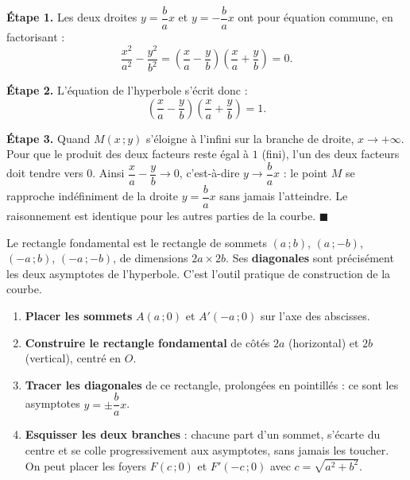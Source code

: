 \documentclass[11pt]{article}
\newcommand{\cle}[1]{{\popxbold\color{popdark}#1}}
\begin{document}
\begin{experience}
\textbf{Étape 1.} Les deux droites $y = \dfrac{b}{a}x$ et $y = -\dfrac{b}{a}x$ ont pour équation commune, en factorisant :
\[ \frac{x^2}{a^2} - \frac{y^2}{b^2} = \left(\frac{x}{a} - \frac{y}{b}\right)\left(\frac{x}{a} + \frac{y}{b}\right) = 0. \]

\textbf{Étape 2.} L'équation de l'hyperbole s'écrit donc :
\[ \left(\frac{x}{a} - \frac{y}{b}\right)\left(\frac{x}{a} + \frac{y}{b}\right) = 1. \]

\textbf{Étape 3.} Quand $M(x\,;y)$ s'éloigne à l'infini sur la branche de droite, $x \to +\infty$. Pour que le produit des deux facteurs reste égal à $1$ (fini), l'un des deux facteurs doit tendre vers $0$. Ainsi $\dfrac{x}{a} - \dfrac{y}{b} \to 0$, c'est-à-dire $y \to \dfrac{b}{a}x$ : le point $M$ se rapproche indéfiniment de la droite $y = \dfrac{b}{a}x$ sans jamais l'atteindre. Le raisonnement est identique pour les autres parties de la courbe. \hfill$\blacksquare$
\end{experience}

\begin{definition}
Le \cle{rectangle fondamental} est le rectangle de sommets $(a\,;b)$, $(a\,;-b)$, $(-a\,;b)$, $(-a\,;-b)$, de dimensions $2a \times 2b$. Ses \textbf{diagonales} sont précisément les deux asymptotes de l'hyperbole. C'est l'outil pratique de construction de la courbe.
\end{definition}

\begin{methode}
\begin{enumerate}
\item \textbf{Placer les sommets} $A(a\,;0)$ et $A'(-a\,;0)$ sur l'axe des abscisses.
\item \textbf{Construire le rectangle fondamental} de côtés $2a$ (horizontal) et $2b$ (vertical), centré en $O$.
\item \textbf{Tracer les diagonales} de ce rectangle, prolongées en pointillés : ce sont les asymptotes $y = \pm \dfrac{b}{a}x$.
\item \textbf{Esquisser les deux branches} : chacune part d'un sommet, s'écarte du centre et se colle progressivement aux asymptotes, sans jamais les toucher. On peut placer les foyers $F(c\,;0)$ et $F'(-c\,;0)$ avec $c = \sqrt{a^2+b^2}$.
\end{enumerate}
\end{methode}
\end{document}
